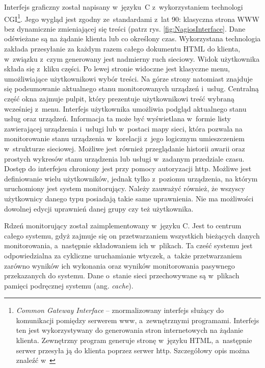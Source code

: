 Interfejs graficzny został napisany w~języku~C z~wykorzystaniem
technologi CGI\footnote{{\em Common Gateway Interface} --
  znormalizowany interfejs służący do komunikacji pomiędzy serwerem
  www, a~zewnętrznymi programami. Interfejs ten jest wykorzystywany do
  generowania stron internetowych na żądanie klienta. Zewnętrzny
  program generuje stronę w~języku HTML, a~następnie serwer przesyła
  ją do klienta poprzez serwer http. Szczegółowy opis można znaleźć
  w~\cite{www:CGI}}. Jego wygląd jest zgodny ze~standardami z~lat 90:
klasyczna strona WWW bez dynamicznie zmieniającej się treści (patrz
rys. \ref{fig:NagiosInterface}. Dane odświeżane są na żądanie klienta
lub co określony czas. Wykorzystana technologia zakłada przesyłanie za
każdym razem całego dokumentu HTML do klienta, w~związku z~czym
generowany jest nadmierny ruch sieciowy. Widok użytkownika składa się
z~kliku części. Po lewej stronie widoczne jest klasyczne menu,
umożliwiające użytkownikowi wybór treści. Na górze strony natomiast
znajduje się podsumowanie aktualnego stanu monitorowanych urządzeń
i~usług. Centralną część okna zajmuje pulpit, który prezentuje
użytkownikowi treść wybraną wcześniej z~menu. Interfejs użytkownika
umożliwia podgląd aktualnego stanu usług oraz urządzeń. Informacja ta
może być wyświetlana w~formie listy zawierającej urządzenia i~usługi
lub w~postaci mapy sieci, która pozwala na monitorowanie stanu
urządzenia w~korelacji z~jego logicznym umieszczeniem w~strukturze
sieciowej. Możliwe jest również przeglądanie historii awarii oraz
prostych wykresów stanu urządzenia lub usługi w~zadanym przedziale
czasu. Dostęp do interfejsu chroniony jest przy pomocy autoryzacji
http. Możliwe jest definiowanie wielu użytkowników, jednak tylko
z~poziomu urządzenia, na którym uruchomiony jest system
monitorujący. Należy zauważyć również, że wszyscy użytkownicy danego
typu posiadają takie same uprawnienia. Nie ma możliwości dowolnej
edycji uprawnień danej grupy czy też użytkownika.

Rdzeń monitorujący został zaimplementowany w~języku C. Jest to centrum
całego systemu, gdyż zajmuje się on przetwarzaniem wszystkich
bieżących danych monitorowania, a~następnie składowaniem ich
w~plikach. Ta cześć systemu jest odpowiedzialna za cykliczne
uruchamianie wtyczek, a~także przetwarzaniem zarówno wyników ich
wykonania oraz wyników monitorowania pasywnego przekazanych do
systemu. Dane o~stanie sieci przechowywane są w~plikach pamięci
podręcznej systemu (ang. {\em cache}).

